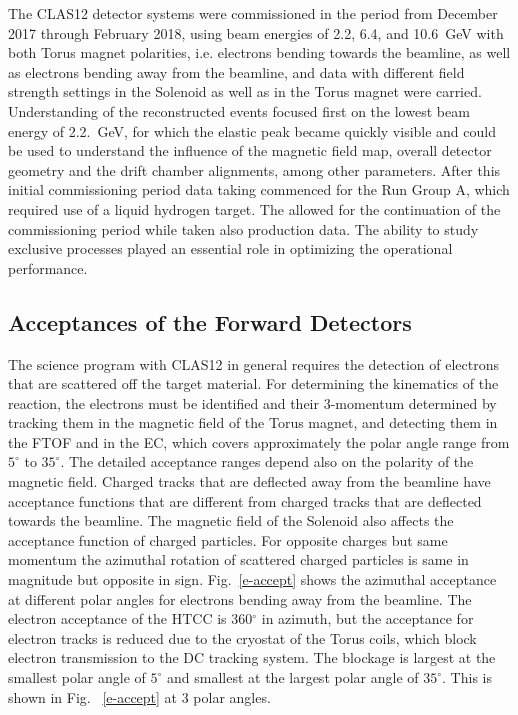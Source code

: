 \documentclass[final,3p,times,twocolumn,authoryear]{elsarticle}
\begin{document}
The CLAS12 detector systems were commissioned in the period from December 2017 through February 2018, using beam
energies of 2.2, 6.4, and 10.6~GeV with both Torus magnet polarities, i.e. electrons bending towards the beamline, as well as
electrons bending away from the beamline, and data with different field strength settings in the Solenoid as well as in the
Torus magnet were carried. Understanding of the reconstructed events focused first on the lowest beam energy of 2.2.~GeV,
for which the elastic peak became quickly visible and could be used to understand the influence of the magnetic field map, 
overall detector geometry and the drift chamber alignments, among other parameters. After this initial commissioning period
data taking commenced for the Run Group A, which required use of a liquid hydrogen target. The allowed for the continuation of
the commissioning period while taken also production data. The ability to study exclusive processes played an essential role in
optimizing the operational performance. 

\subsection{Acceptances of the Forward Detectors} 

The science program with CLAS12 in general requires the detection of electrons that are scattered off the target material. 
For determining the kinematics of the reaction, the electrons must be identified and their 3-momentum determined by tracking
them in the magnetic field of the Torus magnet, and detecting them in the FTOF and in the EC, which covers approximately 
the polar angle range from $5^\circ$ to $35^\circ$. The detailed acceptance ranges depend also on the polarity of the 
magnetic field. Charged tracks that are deflected away from the beamline have acceptance functions that are different from
charged tracks that are deflected towards the beamline. The magnetic field of the Solenoid also affects the acceptance function
of charged particles. For opposite charges but same momentum the azimuthal rotation of scattered charged particles is same in
magnitude but opposite in sign.  Fig.~\ref{e-accept} shows the azimuthal acceptance at different polar angles for electrons
bending away from the beamline.  The electron acceptance of the HTCC is 360$^\circ$ in azimuth, but the acceptance for electron
tracks is reduced due to the cryostat of the Torus coils, which block electron transmission to the DC tracking system. The blockage
is largest at the smallest polar angle of $5^\circ$ and smallest at the largest polar angle of  $35^\circ$. This is shown 
in Fig.~ \ref{e-accept} at 3 polar angles.  
\end{document}
